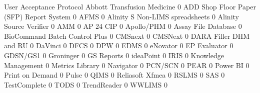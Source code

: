 \documentclass{article}
\begin{document}
\begin{Schunk}
\begin{Soutput}
                                           User Acceptance Protocol
  Abbott Transfusion Medicine                                     0
  ADD Shop Floor Paper (SFP) Report System                        0
  AFMS                                                            0
  Alinity S Non-LIMS spreadsheets                                 0
  Alinity Source Verifier                                         0
  AMM                                                             0
  AP 24 CIP                                                       0
  Apollo/PHM                                                      0
  Assay File Database                                             0
  BioCommand Batch Control Plus                                   0
  CMSnext                                                         0
  CMSNext                                                         0
  DARA Filler DHM and RU                                          0
  DaVinci                                                         0
  DFCS                                                            0
  DPW                                                             0
  EDMS                                                            0
  eNovator                                                        0
  EP Evaluator                                                    0
  GDSN/GS1                                                        0
  Groninger                                                       0
  GS Reports                                                      0
  ideaPoint                                                       0
  IRIS                                                            0
  Knowledge Management                                            0
  Metrics Library                                                 0
  Navigator                                                       0
  PCN/SCN                                                         0
  PEAR                                                            0
  Power BI                                                        0
  Print on Demand                                                 0
  Pulse                                                           0
  QIMS                                                            0
  Reliasoft Xfmea                                                 0
  RSLMS                                                           0
  SAS                                                             0
  TestComplete                                                    0
  TODS                                                            0
  TrendReader                                                     0
  WWLIMS                                                          0
                                          

\end{Soutput}
\end{Schunk}
\end{document}

